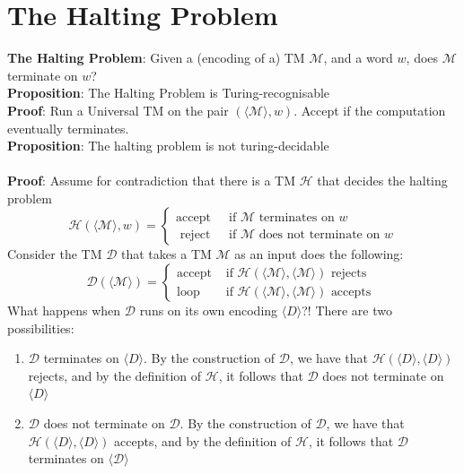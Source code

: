 \documentclass{article}[18pt]
\begin{document}
\section{The Halting Problem}
\textbf{The Halting Problem}: Given a (encoding of a) TM $\mathscr{M}$, and a word $w$, does $\mathscr{M}$ terminate on $w$?\\
\textbf{Proposition}: The Halting Problem is Turing-recognisable\\
\textbf{Proof}: Run a Universal TM on the pair $(\langle\mathscr{M}\rangle,w)$. Accept if the computation eventually terminates.\\
\textbf{Proposition}: The halting problem is not turing-decidable\\
\\
\textbf{Proof}: Assume for contradiction that there is a TM $\mathscr{H}$ that decides the halting problem
$$\mathscr{H}(\langle\mathscr{M}\rangle, w)=\left\{\begin{array}{ll}{\operatorname{accept}} & {\text { if } \mathscr{M} \text { terminates on } w} \\ {\text { reject }} & {\text { if } \mathscr{M} \text { does not terminate on } w}\end{array}\right.$$
Consider the TM $\mathscr{D}$ that takes a TM $\mathscr{M}$ as an input does the following:
$$\mathscr{D}(\langle\mathscr{M}\rangle)=\left\{\begin{array}{ll}{\operatorname{accept}} & {\text { if } \mathscr{H}(\langle\mathscr{M}\rangle,\langle\mathscr{M}\rangle) \text { rejects }} \\ {\operatorname{loop}} & {\text { if } \mathscr{H}(\langle\mathscr{M}\rangle,\langle\mathscr{M}\rangle) \text { accepts }}\end{array}\right.$$
What happens when $\mathscr{D}$ runs on its own encoding $\langle D\rangle$?! There are two possibilities:
\begin{enumerate}
	\item $\mathscr{D}$ terminates on $\langle D \rangle$. By the construction of $\mathscr{D}$, we have that $\mathscr{H}(\langle D\rangle, \langle D \rangle)$ rejects, and by the definition of $\mathscr{H}$, it follows that $\mathscr{D}$ does not terminate on $\langle D \rangle$
	\item $\mathscr{D}$ does not terminate on $\mathscr{D}$. By the construction of $\mathscr{D}$, we have that $\mathscr{H}(\langle D\rangle, \langle D \rangle)$ accepts, and by the definition of $\mathscr{H}$, it follows that $\mathscr{D}$ terminates on $\langle \mathscr{D}\rangle$ 
\end{enumerate}
\end{document}
